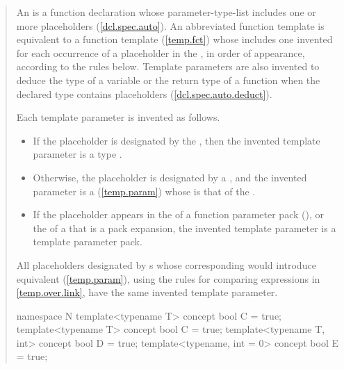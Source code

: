 \begin{quote}
\begin{addedblock}
\pnum
An  is a function declaration whose
parameter-type-list includes one or more placeholders (\ref{dcl.spec.auto}).
% 
An abbreviated function template is equivalent to a function template
(\ref{temp.fct}) whose 
includes one invented  for each occurrence 
of a placeholder in the ,
in order of appearance, according to the rules below.
% 
\enternote
Template parameters are also invented to deduce the type of a variable
or the return type of a function when the declared type contains placeholders 
(\ref{dcl.spec.auto.deduct}).
\exitnote

\pnum
Each template parameter is invented as follows.
\begin{itemize}
\item If the placeholder is designated by the 
, then the invented template 
parameter is a type .

\item Otherwise, the placeholder is designated by a 
, and the invented 
parameter is a  (\ref{temp.param}) whose 
 is that of the 
.

\item If the placeholder appears in the  of a 
function parameter pack (), or the 
 of a  that is a pack 
expansion, the invented template parameter is a 
template parameter pack.
\end{itemize}
% 
All placeholders designated by s 
whose corresponding  would introduce 
equivalent  (\ref{temp.param}), 
using the rules for comparing expressions in \ref{temp.over.link}, have 
the same invented template parameter.
% 
\enterexample
\begin{codeblock}
namespace N {
  template<typename T> concept bool C = true;
}
template<typename T> concept bool C = true;
template<typename T, int> concept bool D = true;
template<typename, int = 0> concept bool E = true;


\end{codeblock}
\end{addedblock}
\end{quote}
